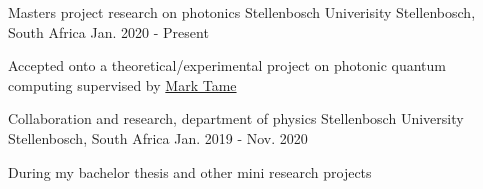 

\begin{cventries}

  \cventry
    {Masters project research on photonics} %
    {Stellenbosch Univerisity} %
    {Stellenbosch, South Africa} %
    {Jan. 2020 - Present} %
    {
      \begin{cvitems} %
      \item  {Accepted onto a theoretical/experimental project on photonic
            quantum computing supervised by
        \href{http://quantumnanophotonics.org/}{Mark Tame}}
      \end{cvitems}
    }

  \cventry
    {Collaboration and research, department of physics} %
    {Stellenbosch University} %
    {Stellenbosch, South Africa} %
    {Jan. 2019 - Nov. 2020} %
    {
      \begin{cvitems} %
        \item {During my bachelor thesis and other mini research projects}
      \end{cvitems}
    }

\end{cventries}
